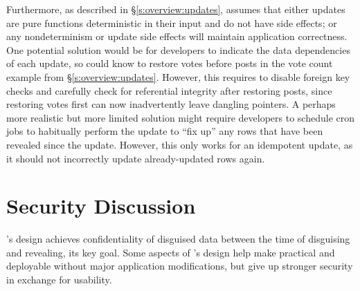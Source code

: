 %
Furthermore, as described in \S\ref{s:overview:updates}, \sys assumes that
either \one{} updates are pure functions deterministic in their input and do not
have side effects; or \two{} any nondeterminism or update side effects will
maintain application correctness.
%
One potential solution would be for developers to indicate the data dependencies
of each update, so \sys could know to \eg restore votes before posts in the
vote count example from \S\ref{s:overview:updates}. However, this
requires \sys to disable foreign key checks and carefully check for referential
integrity after restoring posts, since restoring votes first can now
inadvertently leave dangling pointers. 
%
A perhaps more realistic but more limited solution might require developers to
schedule cron jobs to habitually perform the update to ``fix up'' any rows that
have been revealed since the update. However, this only works for an idempotent
update, as it should not incorrectly update already-updated rows again.  
%


\section{Security Discussion}
\label{s:eval-security}

%
%
\sys's design achieves confidentiality of disguised data between the time of
disguising and revealing, its key goal.
%
Some aspects of \sys's design help make \sys practical and deployable without
major application modifications, but give up stronger security in exchange for
usability.
%

